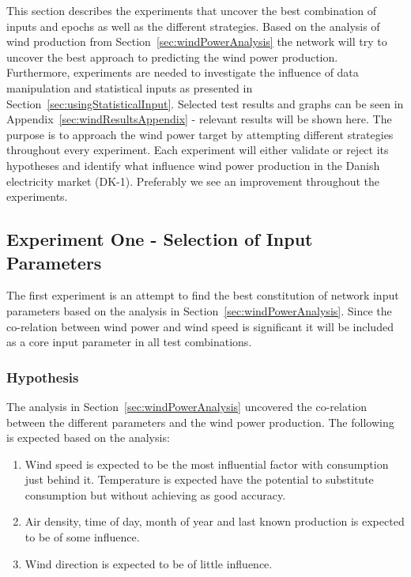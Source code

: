 This section describes the experiments that uncover the best combination of inputs and epochs as well as the different strategies. Based on the analysis of wind production from Section~\ref{sec:windPowerAnalysis} the network will try to uncover the best approach to predicting the wind power production. Furthermore, experiments are needed to investigate the influence of data manipulation and statistical inputs as presented in Section~\ref{sec:usingStatisticalInput}. Selected test results and graphs can be seen in Appendix~\ref{sec:windResultsAppendix} - relevant results will be shown here. The purpose is to approach the wind power target by attempting different strategies throughout every experiment. Each experiment will either validate or reject its hypotheses and identify what influence wind power production in the Danish electricity market (DK-1). Preferably we see an improvement throughout the experiments.


\subsection{Experiment One - Selection of Input Parameters}
\label{sec:windPowerExperimentOne}
The first experiment is an attempt to find the best constitution of network input parameters based on the analysis in Section~\ref{sec:windPowerAnalysis}. Since the co-relation between wind power and wind speed is significant it will be included as a core input parameter in all test combinations.

\subsubsection{Hypothesis}
The analysis in Section~\ref{sec:windPowerAnalysis} uncovered the co-relation between the different parameters and the wind power production. The following is expected based on the analysis:

\begin{enumerate}
\item Wind speed is expected to be the most influential factor with consumption just behind it. Temperature is expected have the potential to substitute consumption but without achieving as good accuracy. 
\item Air density, time of day, month of year and last known production is expected to be of some influence.
\item Wind direction is expected to be of little influence.
\end{enumerate}

